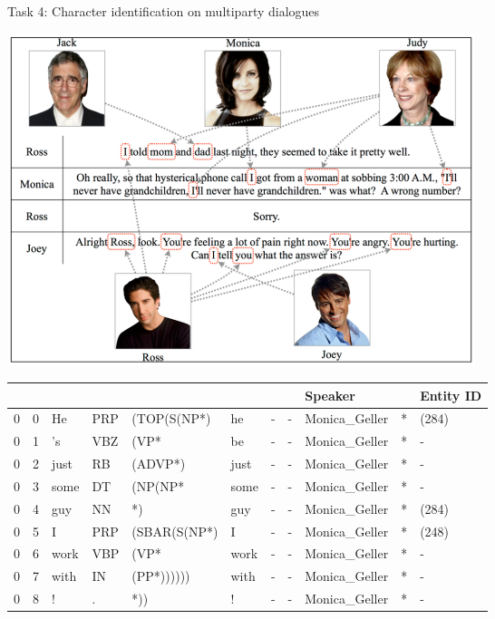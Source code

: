 \documentclass[10pt, compress]{beamer}
\begin{document}
\begin{frame}{Task 4: Character identification on multiparty dialogues}

\begin{center}
  \includegraphics[width=0.6\textwidth]{graphics/coref-friends.png}
\end{center}


{\scriptsize
\begin{tabular}{lllllllllll} 
   &   &    &     &             &     &  &   & \textbf{Speaker}  &   & \textbf{Entity ID} \\
  \hline
 0 & 0 & He & PRP & (TOP(S(NP*) & he & - & - & Monica\_Geller & * & (284) \\
  0 & 1 & 's & VBZ & (VP* & be & - & - & Monica\_Geller & * & - \\
  0 & 2 & just & RB & (ADVP*) & just & - & - & Monica\_Geller & * & - \\
  0 & 3 & some & DT & (NP(NP* & some & - & - & Monica\_Geller & * & - \\
  0 & 4 & guy & NN & *) & guy & - & - & Monica\_Geller & * & (284) \\
  0 & 5 & I & PRP & (SBAR(S(NP*) & I & - & - & Monica\_Geller & * & (248) \\
  0 & 6 & work & VBP & (VP* & work & - & - & Monica\_Geller & * & - \\
  0 & 7 & with & IN & (PP*)))))) & with & - & - & Monica\_Geller & * & - \\
  0 & 8 & ! & . & *)) & ! & - & - & Monica\_Geller & * & - \\
\end{tabular}
}


\end{frame}
\end{document}
